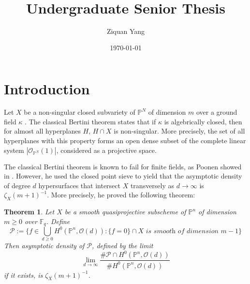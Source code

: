 \documentclass[12pt]{article}
\theoremstyle{plain}
\newtheorem{theorem}[equation]{Theorem}
\theoremstyle{definition}
\newcommand{\IF}{\mathbb{F}}
\newcommand{\IP}{\mathbb{P}}
\newcommand{\sO}{\mathcal{O}}
\newcommand{\sP}{\mathcal{P}}
\newcommand\union{\bigcup}
\newcommand{\<}{\langle}
\renewcommand{\>}{\rangle}
\begin{document}
%
\title{Undergraduate Senior Thesis}
\author{Ziquan Yang}
\date{\today}

\maketitle

\tableofcontents

\section{Introduction}
Let $X$ be a non-singular closed subvariety of $\IP^N$ of dimension $m$ over a ground field $\kappa$ . The classical Bertini theorem states that if $\kappa$ is algebrically closed, then for almost all hyperplanes $H$, $H \cap X$ is non-singular. More precisely, the set of all hyperplanes with this property forms an open dense subset of the complete linear system $|\sO_{\IP^N}(1)|$, considered as a projective space.  

The classical Bertini theorem is known to fail for finite fields, as Poonen showed in \cite{Poonen}. However, he used the closed point sieve to yield that the asymptotic density of degree $d$ hypersurfaces that intersect $X$ transversely as $d \to \infty$ is $\zeta_{X}(m + 1)^{-1}$. More precisely, he proved the following theorem:
\begin{theorem}
Let $X$ be a smooth quasiprojective subscheme of $\IP^n$ of dimension $m \ge 0$ over $\IF_q$. Define 
$$ \sP := \{ f \in \union_{d \ge 0} H^0(\IP^n, \sO(d)) : \{ f = 0 \} \cap X \textit{ is smooth of dimension } m - 1 \}$$
Then asymptotic density of $\sP$, defined by the limit
$$ \lim_{d \to \infty} \frac{\# \sP \cap H^0(\IP^n, \sO(d))}{\# H^0(\IP^n, \sO(d))}$$
if it exists, is $\zeta_X(m + 1)^{-1}$. 
\end{theorem}
\end{document}
